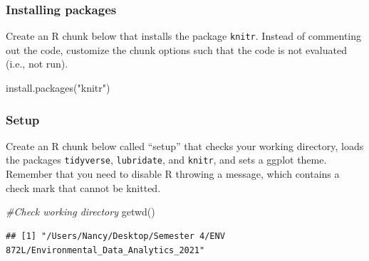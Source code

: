 \documentclass[
]{article}
\newenvironment{Shaded}{\begin{snugshade}}{\end{snugshade}}
\newcommand{\CommentTok}[1]{\textcolor[rgb]{0.56,0.35,0.01}{\textit{#1}}}
\newcommand{\FunctionTok}[1]{\textcolor[rgb]{0.00,0.00,0.00}{#1}}
\newcommand{\NormalTok}[1]{#1}
\newcommand{\StringTok}[1]{\textcolor[rgb]{0.31,0.60,0.02}{#1}}
\begin{document}
\hypertarget{installing-packages}{%
\subsubsection{Installing packages}\label{installing-packages}}

Create an R chunk below that installs the package \texttt{knitr}.
Instead of commenting out the code, customize the chunk options such
that the code is not evaluated (i.e., not run).

\begin{Shaded}
\begin{Highlighting}[]
\FunctionTok{install.packages}\NormalTok{(}\StringTok{"knitr"}\NormalTok{)}
\end{Highlighting}
\end{Shaded}

\hypertarget{setup}{%
\subsubsection{Setup}\label{setup}}

Create an R chunk below called ``setup'' that checks your working
directory, loads the packages \texttt{tidyverse}, \texttt{lubridate},
and \texttt{knitr}, and sets a ggplot theme. Remember that you need to
disable R throwing a message, which contains a check mark that cannot be
knitted.

\begin{Shaded}
\begin{Highlighting}[]
\CommentTok{\#Check working directory}
\FunctionTok{getwd}\NormalTok{()}
\end{Highlighting}
\end{Shaded}

\begin{verbatim}
## [1] "/Users/Nancy/Desktop/Semester 4/ENV 872L/Environmental_Data_Analytics_2021"
\end{verbatim}
\end{document}
